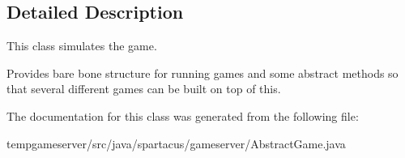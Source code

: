 \subsection{Detailed Description}
This class simulates the game. 

Provides bare bone structure for running games and some abstract methods so that several different games can be built on top of this. 

The documentation for this class was generated from the following file:\begin{DoxyCompactItemize}
\item 
\-t\-e\-m\-p\-g\-a\-m\-e\-s\-e\-r\-v\-e\-r\-/\-s\-r\-c\-/\-j\-a\-v\-a\-/\-s\-p\-a\-r\-t\-a\-c\-u\-s\-/\-g\-a\-m\-e\-s\-e\-r\-v\-e\-r\-/\-A\-b\-s\-t\-r\-a\-c\-t\-G\-a\-m\-e\-.\-j\-a\-v\-a\end{DoxyCompactItemize}
